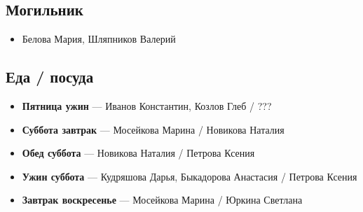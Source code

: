 \subsection*{Могильник}
\begin{itemize}
\item Белова Мария, Шляпников Валерий
\end{itemize}

\subsection*{Еда / посуда}
\begin{itemize}
\item \textbf{Пятница ужин} --- Иванов Константин, Козлов Глеб / ???
\item \textbf{Суббота завтрак} --- Мосейкова Марина / Новикова Наталия
\item \textbf{Обед суббота} --- Новикова Наталия / Петрова Ксения 
\item \textbf{Ужин суббота} --- Кудряшова Дарья, Быкадорова Анастасия / Петрова Ксения 
\item \textbf{Завтрак воскресенье} --- Мосейкова Марина / Юркина Светлана
\end{itemize}